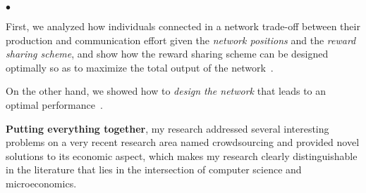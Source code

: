 \documentclass[11pt,psfig,letter]{article}
\newcommand{\squishlisttwo}{
\begin{list}{$\bullet$}
{ \setlength{\itemsep}{0pt}
\setlength{\parsep}{0pt}
\setlength{\topsep}{0pt}
\setlength{\partopsep}{0pt}
\setlength{\leftmargin}{1em}
\setlength{\labelwidth}{1.5em}
\setlength{\labelsep}{0.5em} } }
\newcommand{\squishend}{
\end{list} }
\begin{document}
\squishlisttwo
 \item First, we analyzed how individuals connected in a network trade-off between their production and communication effort given the {\em network positions} and the {\em reward sharing scheme}, and show how the reward sharing scheme can be designed optimally so as to maximize the total output of the network~\cite{Nath2013b}. 
 \item On the other hand, we showed how to {\em design the network} that leads to an optimal performance~\cite{Nath2012}.
\squishend

\smallskip

\noindent
{\bf Putting everything together}, my research addressed several interesting problems on a very recent research area named crowdsourcing and provided novel solutions to its economic aspect, which makes my research clearly distinguishable in the literature that lies in the intersection of computer science and microeconomics.

\small

 

\end{document}

